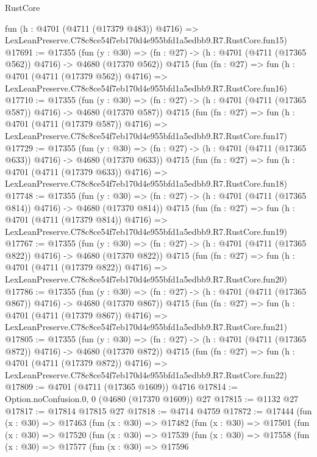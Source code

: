 \begin{lexlean}{RustCore}
\begin{coremodule}
    fun (h : @4701 (@4711 (@17379 @483)) @4716) =>
    LexLeanPreserve.C78c8ce54f7eb170d4e955bfd1a5edbb9.R7.RustCore.fun15)
@17691 := @17355
    (fun (y : @30) => (fn : @27) -> (h : @4701 (@4711 (@17365 @562)) @4716) -> @4680 (@17370 @562))
    @4715
    (fun (fn : @27) =>
    fun (h : @4701 (@4711 (@17379 @562)) @4716) =>
    LexLeanPreserve.C78c8ce54f7eb170d4e955bfd1a5edbb9.R7.RustCore.fun16)
@17710 := @17355
    (fun (y : @30) => (fn : @27) -> (h : @4701 (@4711 (@17365 @587)) @4716) -> @4680 (@17370 @587))
    @4715
    (fun (fn : @27) =>
    fun (h : @4701 (@4711 (@17379 @587)) @4716) =>
    LexLeanPreserve.C78c8ce54f7eb170d4e955bfd1a5edbb9.R7.RustCore.fun17)
@17729 := @17355
    (fun (y : @30) => (fn : @27) -> (h : @4701 (@4711 (@17365 @633)) @4716) -> @4680 (@17370 @633))
    @4715
    (fun (fn : @27) =>
    fun (h : @4701 (@4711 (@17379 @633)) @4716) =>
    LexLeanPreserve.C78c8ce54f7eb170d4e955bfd1a5edbb9.R7.RustCore.fun18)
@17748 := @17355
    (fun (y : @30) => (fn : @27) -> (h : @4701 (@4711 (@17365 @814)) @4716) -> @4680 (@17370 @814))
    @4715
    (fun (fn : @27) =>
    fun (h : @4701 (@4711 (@17379 @814)) @4716) =>
    LexLeanPreserve.C78c8ce54f7eb170d4e955bfd1a5edbb9.R7.RustCore.fun19)
@17767 := @17355
    (fun (y : @30) => (fn : @27) -> (h : @4701 (@4711 (@17365 @822)) @4716) -> @4680 (@17370 @822))
    @4715
    (fun (fn : @27) =>
    fun (h : @4701 (@4711 (@17379 @822)) @4716) =>
    LexLeanPreserve.C78c8ce54f7eb170d4e955bfd1a5edbb9.R7.RustCore.fun20)
@17786 := @17355
    (fun (y : @30) => (fn : @27) -> (h : @4701 (@4711 (@17365 @867)) @4716) -> @4680 (@17370 @867))
    @4715
    (fun (fn : @27) =>
    fun (h : @4701 (@4711 (@17379 @867)) @4716) =>
    LexLeanPreserve.C78c8ce54f7eb170d4e955bfd1a5edbb9.R7.RustCore.fun21)
@17805 := @17355
    (fun (y : @30) => (fn : @27) -> (h : @4701 (@4711 (@17365 @872)) @4716) -> @4680 (@17370 @872))
    @4715
    (fun (fn : @27) =>
    fun (h : @4701 (@4711 (@17379 @872)) @4716) =>
    LexLeanPreserve.C78c8ce54f7eb170d4e955bfd1a5edbb9.R7.RustCore.fun22)
@17809 := @4701 (@4711 (@17365 @1609)) @4716
@17814 := Option.noConfusion.{0, 0} (@4680 (@17370 @1609)) @27
@17815 := @1132 @27
@17817 := @17814 @17815 @27
@17818 := @4714 @4759
@17872 := @17444
    (fun (x : @30) =>
    @17463
      (fun (x : @30) =>
      @17482
        (fun (x : @30) =>
        @17501
          (fun (x : @30) =>
          @17520
            (fun (x : @30) =>
            @17539
              (fun (x : @30) =>
              @17558
                (fun (x : @30) =>
                @17577
                  (fun (x : @30) =>
                  @17596

\end{coremodule}
\end{lexlean}
